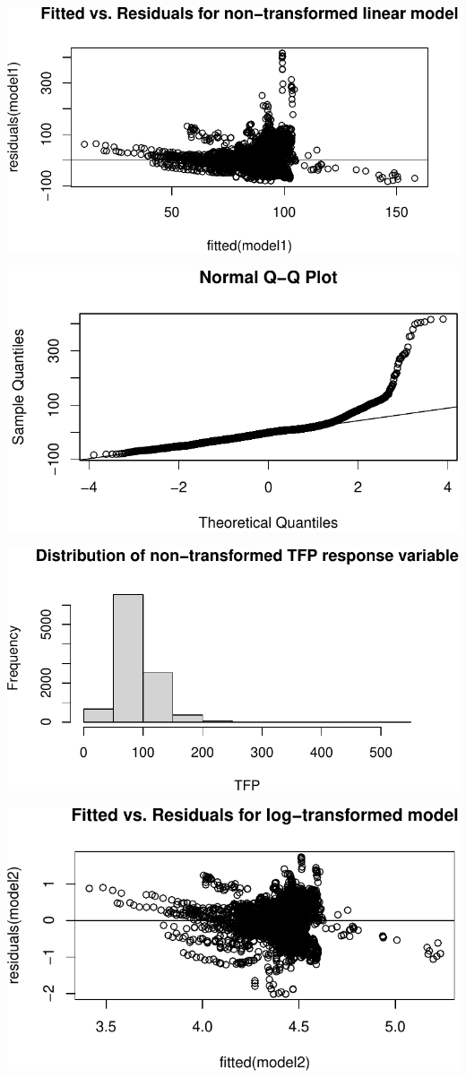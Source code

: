 \documentclass[
  letterpaper,
  DIV=11,
  numbers=noendperiod]{scrartcl}
\begin{document}
\includegraphics{Smith_Gabrielle_EDS222Final_files/figure-pdf/unnamed-chunk-10-1.pdf}

\includegraphics{Smith_Gabrielle_EDS222Final_files/figure-pdf/unnamed-chunk-10-2.pdf}

\includegraphics{Smith_Gabrielle_EDS222Final_files/figure-pdf/unnamed-chunk-10-3.pdf}

\includegraphics{Smith_Gabrielle_EDS222Final_files/figure-pdf/unnamed-chunk-11-1.pdf}
\end{document}
